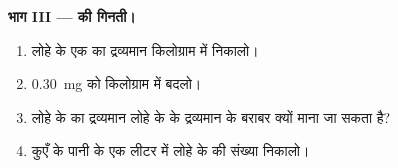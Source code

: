 \begin{problem}
\medskip
\noindent\textbf{भाग III ---  की गिनती।}
\begin{enumerate}[resume]
  \item लोहे के एक  का द्रव्यमान किलोग्राम में निकालो।
  \item \qty{0.30}{mg} को किलोग्राम में बदलो।
  \item लोहे के  का द्रव्यमान लोहे के  के द्रव्यमान के बराबर क्यों
        माना जा सकता है?
  \item कुएँ के पानी के एक लीटर में लोहे के  की संख्या निकालो।
\end{enumerate}
\end{problem}
